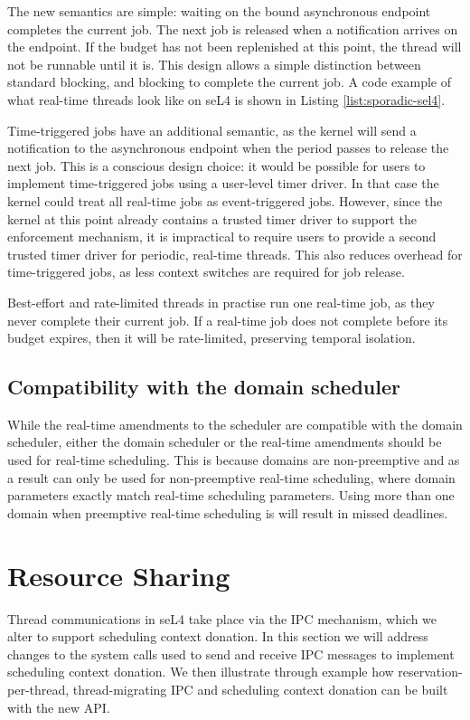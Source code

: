 The new semantics are simple: waiting on the bound asynchronous endpoint completes the current job.
The next job is released when a notification arrives on the endpoint.
If the budget has not been replenished at this point, the thread will not be runnable until it is.
This design allows a simple distinction between standard blocking, and blocking to complete the current job.
A code example of what real-time threads look like on seL4 is shown in Listing \ref{list:sporadic-sel4}.

Time-triggered jobs have an additional semantic, as the kernel will send a notification to the asynchronous endpoint when the period passes to release the next job.
This is a conscious design choice: it would be possible for users to implement time-triggered jobs using a user-level timer driver.
In that case the kernel could treat all real-time jobs as event-triggered jobs.
However, since the kernel at this point already contains a trusted timer driver to support the enforcement mechanism, it is impractical to require users to provide a second trusted timer driver for periodic, real-time threads.
This also reduces overhead for time-triggered jobs, as less context switches are required for job release.

Best-effort and rate-limited threads in practise run one real-time job, as they never complete their current job.
If a real-time job does not complete before its budget expires, then it will be rate-limited, preserving temporal isolation.

\subsection{Compatibility with the domain scheduler}

While the real-time amendments to the scheduler are compatible with the domain scheduler, either the domain scheduler or the real-time amendments should be used for real-time scheduling.
This is because domains are non-preemptive and as a result can only be used for non-preemptive real-time scheduling, where domain parameters exactly match real-time scheduling parameters.
Using more than one domain when preemptive real-time scheduling is will result in missed deadlines.



\section{Resource Sharing}

Thread communications in seL4 take place via the IPC mechanism, which we alter to support scheduling context donation.
In this section we will address changes to the system calls used to send and receive IPC messages to implement scheduling context donation.
We then illustrate through example how reservation-per-thread, thread-migrating IPC and scheduling context donation can be built with the new \gls{API}.

